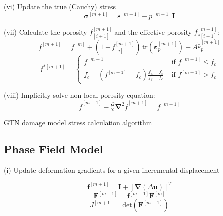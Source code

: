 \documentclass[sn-mathphys,Numbered]{sn-jnl}%
\newcommand{\bb}{\boldsymbol}
\begin{document}
\begin{appendices}
\begin{algorithm}[htbp]
(vi) Update the true (Cauchy) stress
\begin{equation}
	\boldsymbol{\sigma}^{[m+1]} = \boldsymbol{s}^{[m+1]} -  p^{[m+1]}\textbf{I} \nonumber
\end{equation}


(vii) Calculate the porosity $f_{[i+1]}^{[m+1]}$ and the effective porosity $f_{*[i+1]}^{[m+1]}$:
\begin{equation}
	f^{[m+1]} = f^{[m]} + \left(1 - f^{[m+1]}_{[i]}\right) \, \text{tr}\left(\dot{\boldsymbol{\varepsilon}}^{[m+1]}_p\right)
	+ A \dot{\bar{\varepsilon}}^{[m+1]}_p
\end{equation}
\begin{equation}
	f^{*[m+1]} =
	\left\{
	\begin{array}{ll}
		f^{[m+1]}  & \text { if } f^{[m+1]}  \leq f_c \\
		f_c + \left(f^{[m+1]} - f_c\right) \frac{f_u - f_c}{f_f - f_c} & \text { if } f^{[m+1]}  > f_c
	\end{array}\right.
\end{equation}


(viii) Implicitly solve non-local porosity equation:
\begin{equation}
	\bar{f}^{[m+1]} -  l_c^2 \bb{\nabla}^2 \bar{f}^{[m+1]} = f^{[m+1]}
\end{equation}

\caption{GTN damage model stress calculation algorithm}
\end{algorithm}




\subsection{Phase Field Model}



\begin{algorithm}[htbp] \label{alg:phaseField} \footnotesize
\SetAlgoLined
(i) Update deformation gradients for a given incremental displacement

\begin{equation}
  \bb{f}^{[m+1]} = \bb{I} + \left[ \bb{\nabla}(\Delta\textbf{u}) \right]^T \nonumber
\end{equation}
\begin{equation}
  \bb{F}^{[m+1]} = \bb{f}^{[m+1]} \bb{F}^{[m]}  \nonumber
\end{equation}
\begin{equation}
  J^{[m+1]} = \text{det} \left( \bb{F}^{[m+1]} \right) \nonumber
\end{equation}


\end{algorithm}
\end{appendices}
\end{document}
